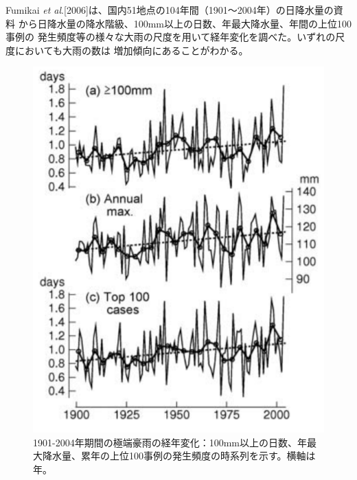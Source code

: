 Fumikai \textit{et al}.[2006]は、国内51地点の104年間（1901～2004年）の日降水量の資料
から日降水量の降水階級、100mm以上の日数、年最大降水量、年間の上位100事例の
発生頻度等の様々な大雨の尺度を用いて経年変化を調べた。いずれの尺度においても大雨の数は
増加傾向にあることがわかる。

\begin{figure}[H]
\begin{center}
\includegraphics[width=0.8\linewidth]{fig/intro/fumikai-et-al-chart1.png}
\caption{1901-2004年期間の極端豪雨の経年変化：100mm以上の日数、年最大降水量、累年の上位100事例の発生頻度の時系列を示す。横軸は年。}
\end{center}
\end{figure}